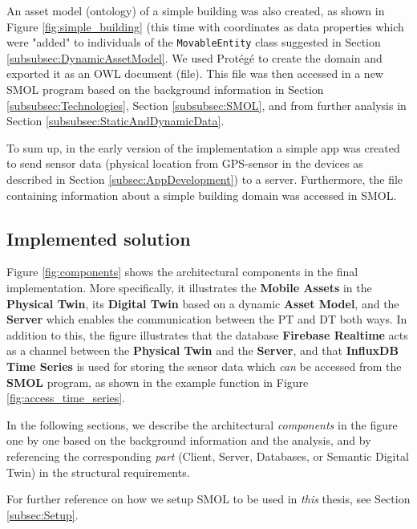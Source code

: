 \documentclass{article}
\begin{document}
An asset model (ontology) of a simple building was also created, as shown in Figure \ref{fig:simple_building} (this time with coordinates as data properties which were "added" to individuals of the \verb|MovableEntity| class suggested in Section \ref{subsubsec:DynamicAssetModel}. We used Protégé to create the domain and exported it as an OWL document (file). This file was then accessed in a new SMOL program based on the background information in Section \ref{subsubsec:Technologies}, Section \ref{subsubsec:SMOL}, and from further analysis in Section \ref{subsubsec:StaticAndDynamicData}. 

To sum up, in the early version of the implementation a simple app was created to send sensor data (physical location from GPS-sensor in the devices as described in Section \ref{subsec:AppDevelopment}) to a server. Furthermore, the file containing information about a simple building domain was accessed in SMOL.


\subsection{Implemented solution}\label{subsec:ImplementedSolution}
Figure \ref{fig:components} shows the architectural components in the final implementation. More specifically, it illustrates the \textbf{Mobile Assets} in the \textbf{Physical Twin}, its \textbf{Digital Twin} based on a dynamic \textbf{Asset Model}, and the \textbf{Server} which enables the communication between the PT and DT both ways. In addition to this, the figure illustrates that the database \textbf{Firebase Realtime} acts as a channel between the \textbf{Physical Twin} and the \textbf{Server}, and that \textbf{InfluxDB Time Series} is used for storing the sensor data which \emph{can} be accessed from the \textbf{SMOL} program, as shown in the example function in Figure \ref{fig:access_time_series}.

In the following sections, we describe the architectural \emph{components} in the figure one by one based on the background information and the analysis, and by referencing the corresponding \emph{part} (Client, Server, Databases, or Semantic Digital Twin) in the structural requirements.

For further reference on how we setup SMOL to be used in \emph{this} thesis, see Section \ref{subsec:Setup}.
\end{document}
